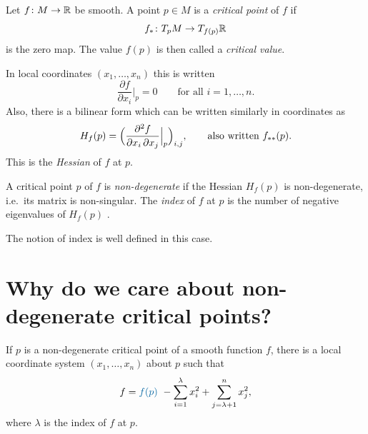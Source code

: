 \begin{definition}
\label{L9:def:critical}
Let $f\colon M\to\mathbb{R}$ be smooth. A point $p\in M$ is a \emph{critical point} of $f$ if
\[
  f_*\colon T_pM\to T_{f(p)}\mathbb{R}
\]
is the zero map. The value $f(p)$ is then called a \emph{critical value}.
\end{definition}

In local coordinates $(x_1,\dots,x_n)$  this is written
\[
  \frac{\partial f}{\partial x_i}\Big|_p = 0\qquad\text{for all } i=1,\dots,n .
\]
Also, there is a bilinear form  which can be
written similarly in coordinates as
\[
  H_f(p)=\Bigl(\frac{\partial^2 f}{\partial x_i\,\partial x_j}\Big|_p\Bigr)_{i,j},
  \qquad\text{also written } f_{**}(p).
\]
This is the \emph{Hessian} of $f$ at $p$.

\begin{definition}
\label{L9:def:nondeg}
A critical point $p$ of $f$ is \emph{non-degenerate} if the Hessian $H_f(p)$ is
non-degenerate, i.e.\ its matrix is non-singular. The \emph{index} of $f$ at $p$ is the
number of negative eigenvalues of $H_f(p)$ .
\end{definition}

The notion of index is well defined in this case.

\section{Why do we care about non-degenerate critical points?}
\label{L9:sec:morselemma}

\begin{lemma}
\label{L9:lem:morse}
If $p$ is a non-degenerate critical point of a smooth function $f$, there is a local
coordinate system $(x_1,\dots,x_n)$ about $p$  such that
\[
  f = \added{f(p)}\ - \sum_{i=1}^{\lambda} x_i^2 + \sum_{j=\lambda+1}^{n} x_j^2 ,
\]
where $\lambda$ is the index of $f$ at $p$.
\end{lemma}

